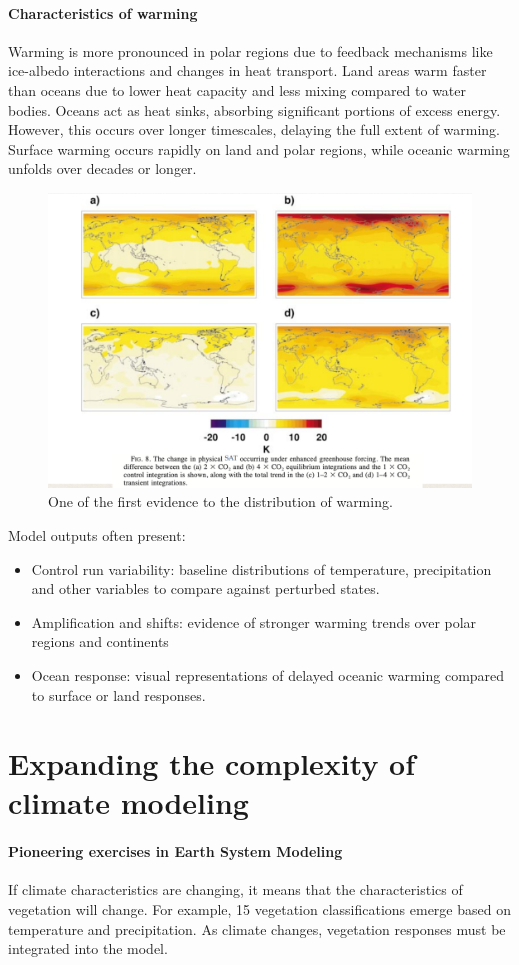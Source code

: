 \paragraph{Characteristics of warming}
Warming is more pronounced in polar regions due to feedback mechanisms like ice-albedo interactions and changes in heat transport. Land areas warm faster than oceans due to lower heat capacity and less mixing compared to water bodies. Oceans act as heat sinks, absorbing significant portions of excess energy. However, this occurs over longer timescales, delaying the full extent of warming. Surface warming occurs rapidly on land and polar regions, while oceanic warming unfolds over decades or longer.

\begin{figure}[htpb]
	\centering
	\includegraphics[width=0.5\linewidth]{uploads/imagewarming.png}
	\caption{One of the first evidence to the distribution of warming.}
	\label{fig:warming}
\end{figure}

Model outputs often present:
\begin{itemize}
	\item Control run variability: baseline distributions of temperature, precipitation and other variables to compare against perturbed states.
	\item Amplification and shifts: evidence of stronger warming trends over polar regions and continents
	\item Ocean response: visual representations of delayed oceanic warming compared to surface or land responses.
\end{itemize}
\section{Expanding the complexity of climate modeling}
\paragraph{Pioneering exercises in Earth System Modeling} If climate characteristics are changing, it means that the characteristics of vegetation will change. For example, 15 vegetation classifications emerge based on temperature and precipitation. As climate changes, vegetation responses must be integrated into the model. \\

